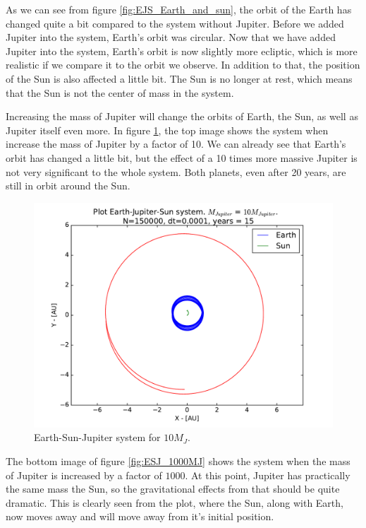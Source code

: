 \documentclass[12pt]{article}
\begin{document}
As we can see from figure \ref{fig:EJS_Earth_and_sun}, the orbit of the Earth has changed quite a bit compared to the system without Jupiter. Before we added Jupiter into the system, Earth's orbit was circular. Now that we have added Jupiter into the system, Earth's orbit is now slightly more ecliptic, which is more realistic if we compare it to the orbit we observe. In addition to that, the position of the Sun is also affected a little bit. The Sun is no longer at rest, which means that the Sun is not the center of mass in the system.

Increasing the mass of Jupiter will change the orbits of Earth, the Sun, as well as Jupiter itself even more. In figure \ref{ESJ_10MJ}, the top image shows the system when increase the mass of Jupiter by a factor of 10. We can already see that Earth's orbit has changed a little bit, but the effect of a 10 times more massive Jupiter is not very significant to the whole system. Both planets, even after 20 years, are still in orbit around the Sun.
\begin{figure}[!h]
\centering
\includegraphics[width=\linewidth]{Plots/Earth_Sun_Jupiter_10MJ.pdf}
\caption{Earth-Sun-Jupiter system for $10M_J$.}
\label{ESJ_10MJ}
\end{figure}

The bottom image of figure \ref{fig:ESJ_1000MJ} shows the system when the mass of Jupiter is increased by a factor of $1000$. At this point, Jupiter has practically the same mass the Sun, so the gravitational effects from that should be quite dramatic. This is clearly seen from the plot, where the Sun, along with Earth, now moves away and will move away from it's initial position. 
\end{document}
